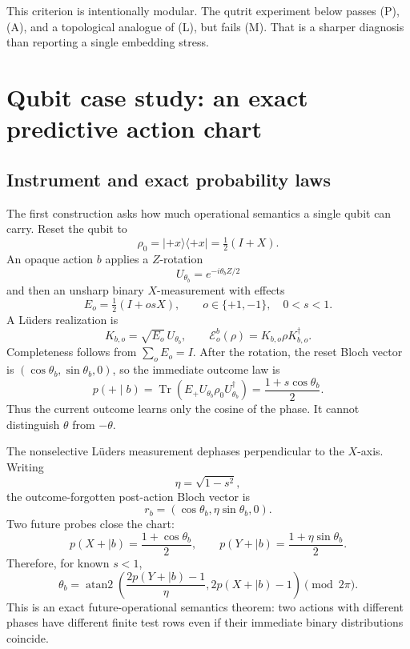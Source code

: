 \documentclass[11pt]{article}
\theoremstyle{definition}
\theoremstyle{remark}
\newcommand{\cE}{\mathcal E}
\newcommand{\Tr}{\operatorname{Tr}}
\begin{document}
This criterion is intentionally modular. The qutrit experiment below passes
(P), (A), and a topological analogue of (L), but fails (M). That is a sharper
diagnosis than reporting a single embedding stress.

\section{Qubit case study: an exact predictive action chart}
\label{sec:qubit}

\subsection{Instrument and exact probability laws}

The first construction asks how much operational semantics a single qubit can
carry. Reset the qubit to
\[
\rho_0=|{+x}\rangle\langle{+x}|=\tfrac12(I+X).
\]
An opaque action \(b\) applies a \(Z\)-rotation
\[
U_{\theta_b}=e^{-i\theta_b Z/2}
\]
and then an unsharp binary \(X\)-measurement with effects
\[
E_o=\tfrac12(I+osX),\qquad o\in\{+1,-1\},\quad 0<s<1.
\]
A Lüders realization is
\[
K_{b,o}=\sqrt{E_o}\,U_{\theta_b},\qquad
\cE^b_o(\rho)=K_{b,o}\rho K_{b,o}^\dagger.
\]
Completeness follows from \(\sum_oE_o=I\). After the rotation, the reset Bloch
vector is \((\cos\theta_b,\sin\theta_b,0)\), so the immediate outcome law is
\begin{equation}
\label{eq:qubit-immediate}
p(+\mid b)=\Tr(E_+U_{\theta_b}\rho_0U_{\theta_b}^\dagger)
=\frac{1+s\cos\theta_b}{2}.
\end{equation}
Thus the current outcome learns only the cosine of the phase. It cannot
distinguish \(\theta\) from \(-\theta\).

The nonselective Lüders measurement dephases perpendicular to the \(X\)-axis.
Writing
\[
\eta=\sqrt{1-s^2},
\]
the outcome-forgotten post-action Bloch vector is
\[
r_b=(\cos\theta_b,\eta\sin\theta_b,0).
\]
Two future probes close the chart:
\begin{equation}
\label{eq:qubit-probes}
p(X+\mid b)=\frac{1+\cos\theta_b}{2},\qquad
p(Y+\mid b)=\frac{1+\eta\sin\theta_b}{2}.
\end{equation}
Therefore, for known \(s<1\),
\begin{equation}
\label{eq:phase-recovery}
\theta_b=
\operatorname{atan2}\!\left(
\frac{2p(Y+\mid b)-1}{\eta},
2p(X+\mid b)-1
\right)
\pmod{2\pi}.
\end{equation}
This is an exact future-operational semantics theorem: two actions with
different phases have different finite test rows even if their immediate
binary distributions coincide.
\end{document}
